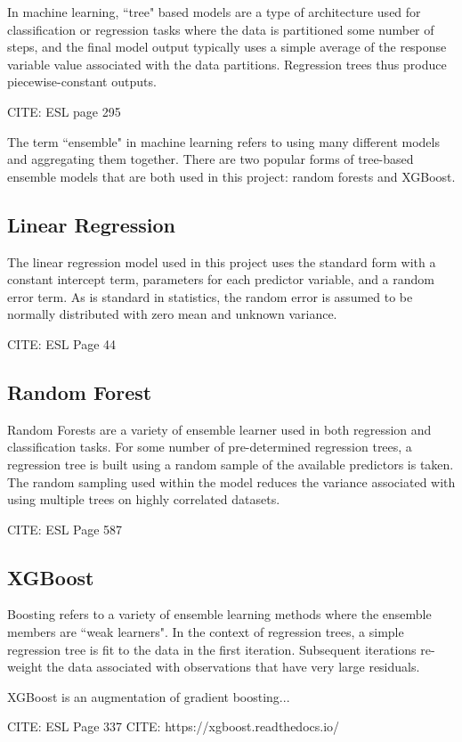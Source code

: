 In machine learning, ``tree" based models are a type of architecture used for classification or regression tasks where the data is partitioned some number of steps, and the final model output typically uses a simple average of the response variable value associated with the data partitions. Regression trees thus produce piecewise-constant outputs.

CITE: ESL page 295

The term ``ensemble" in machine learning refers to using many different models and aggregating them together. There are two popular forms of tree-based ensemble models that are both used in this project: random forests and XGBoost.

\subsection*{Linear Regression}

The linear regression model used in this project uses the standard form with a constant intercept term, parameters for each predictor variable, and a random error term. As is standard in statistics, the random error is assumed to be normally distributed with zero mean and unknown variance. 

CITE: ESL Page 44

\subsection*{Random Forest}

Random Forests are a variety of ensemble learner used in both regression and classification tasks. For some number of pre-determined regression trees, a regression tree is built using a random sample of the available predictors is taken. The random sampling used within the model reduces the variance associated with using multiple trees on highly correlated datasets. 

CITE: ESL Page 587

\subsection*{XGBoost}

Boosting refers to a variety of ensemble learning methods where the ensemble members are ``weak learners". In the context of regression trees, a simple regression tree is fit to the data in the first iteration. Subsequent iterations re-weight the data associated with observations that have very large residuals. 

XGBoost is an augmentation of gradient boosting...

CITE: ESL Page 337
CITE: https://xgboost.readthedocs.io/

